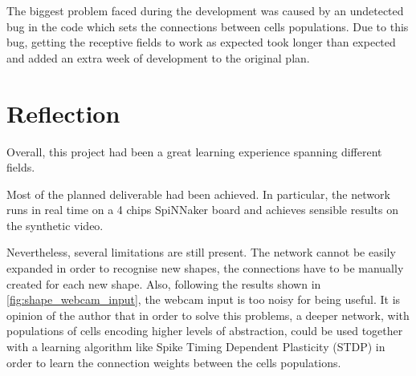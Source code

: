 The biggest problem faced during the development was caused by an undetected bug in the code which sets the connections between cells populations. Due to this bug, getting the receptive fields to work as expected took longer than expected and added an extra week of development to the original plan.

\section{Reflection}
Overall, this project had been a great learning experience spanning different fields. 

Most of the planned deliverable had been achieved. In particular, the network runs in real time on a 4 chips SpiNNaker board and achieves sensible results on the synthetic video.

Nevertheless, several limitations are still present. The network cannot be easily expanded in order to recognise new shapes, the connections have to be manually created for each new shape. Also, following the results shown in \cref{fig:shape_webcam_input}, the webcam input is too noisy for being useful. It is opinion of the author that in order to solve this problems, a deeper network, with populations of cells encoding higher levels of abstraction, could be used together with a learning algorithm like Spike Timing Dependent Plasticity (STDP) \cite{Song2000} in order to learn the connection weights between the cells populations. 